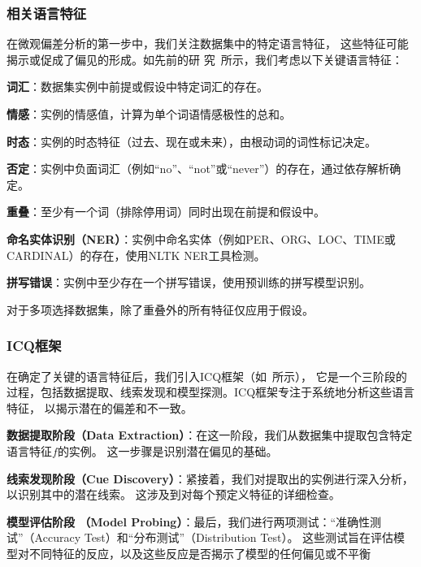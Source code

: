 \subsubsection{相关语言特征}
\label{sec4:extract}
在微观偏差分析的第一步中，我们关注数据集中的特定语言特征，
这些特征可能揭示或促成了偏见的形成。如先前的研
究~\cite{naik2018stress,checklist2020acl}所示，我们考虑以下关键语言特征：

\indent\textbf{词汇}：数据集实例中前提或假设中特定词汇的存在。

\indent\textbf{情感}：实例的情感值，计算为单个词语情感极性的总和。

\indent\textbf{时态}：实例的时态特征（过去、现在或未来），由根动词的词性标记决定。

\indent\textbf{否定}：实例中负面词汇（例如``no''、``not''或``never''）的存在，通过依存解析确定。

\indent\textbf{重叠}：至少有一个词（排除停用词）同时出现在前提和假设中。

\indent\textbf{命名实体识别（NER）}：实例中命名实体（例如PER、ORG、LOC、TIME或CARDINAL）的存在，使用NLTK NER工具检测。

\indent\textbf{拼写错误}：实例中至少存在一个拼写错误，使用预训练的拼写模型识别。

对于多项选择数据集，除了重叠外的所有特征仅应用于假设。

\subsubsection{ICQ框架}
在确定了关键的语言特征后，我们引入ICQ框架（如~所示），
它是一个三阶段的过程，包括数据提取、线索发现和模型探测。ICQ框架专注于系统地分析这些语言特征，
以揭示潜在的偏差和不一致。

\textbf{数据提取阶段（Data Extraction）}：在这一阶段，我们从数据集中提取包含特定语言特征$f$的实例。
这一步骤是识别潜在偏见的基础。

\textbf{线索发现阶段（Cue Discovery）}：紧接着，我们对提取出的实例进行深入分析，以识别其中的潜在线索。
这涉及到对每个预定义特征的详细检查。

\textbf{模型评估阶段 （Model Probing）}：最后，我们进行两项测试：``准确性测试''（Accuracy Test）和``分布测试''（Distribution Test）。
这些测试旨在评估模型对不同特征的反应，以及这些反应是否揭示了模型的任何偏见或不平衡


